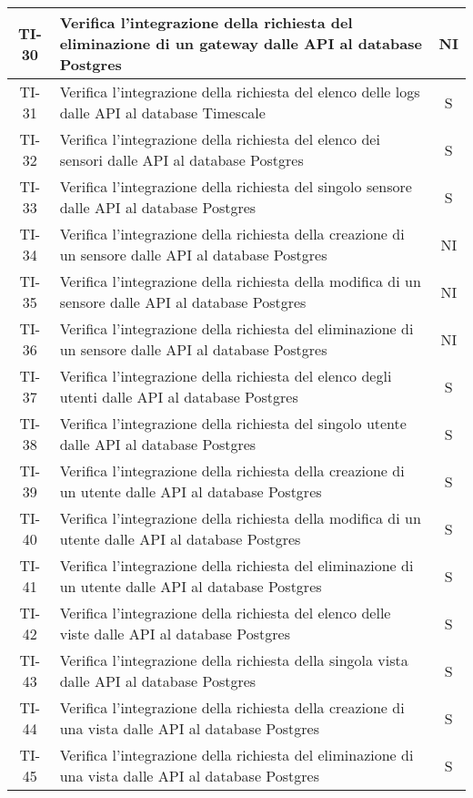 \begin{center}
\begin{longtable}{|c|p{12cm}|c|}
			\hline
			TI-30 & Verifica l'integrazione della richiesta del eliminazione di un gateway dalle API al database Postgres & NI \\
			\hline
			TI-31 & Verifica l'integrazione della richiesta del elenco delle logs dalle API al database Timescale & S \\
			\hline
			TI-32 & Verifica l'integrazione della richiesta del elenco dei sensori dalle API al database Postgres & S \\
			\hline
			TI-33 & Verifica l'integrazione della richiesta del singolo sensore dalle API al database Postgres & S \\
			\hline
			TI-34 & Verifica l'integrazione della richiesta della creazione di un sensore dalle API al database Postgres & NI \\
			\hline
			TI-35 & Verifica l'integrazione della richiesta della modifica di un sensore dalle API al database Postgres & NI \\
			\hline
			TI-36 & Verifica l'integrazione della richiesta del eliminazione di un sensore dalle API al database Postgres & NI \\
			\hline
			TI-37 & Verifica l'integrazione della richiesta del elenco degli utenti dalle API al database Postgres & S \\
			\hline
			TI-38 & Verifica l'integrazione della richiesta del singolo utente dalle API al database Postgres & S \\
			\hline
			TI-39 & Verifica l'integrazione della richiesta della creazione di un utente dalle API al database Postgres & S \\
			\hline
			TI-40 & Verifica l'integrazione della richiesta della modifica di un utente dalle API al database Postgres & S \\
			\hline
			TI-41 & Verifica l'integrazione della richiesta del eliminazione di un utente dalle API al database Postgres & S \\
			\hline
			TI-42 & Verifica l'integrazione della richiesta del elenco delle viste dalle API al database Postgres & S \\
			\hline
			TI-43 & Verifica l'integrazione della richiesta della singola vista dalle API al database Postgres & S \\
			\hline
			TI-44 & Verifica l'integrazione della richiesta della creazione di una vista dalle API al database Postgres & S \\
			\hline
			TI-45 & Verifica l'integrazione della richiesta del eliminazione di una vista dalle API al database Postgres & S \\

\end{longtable}
\end{center}
